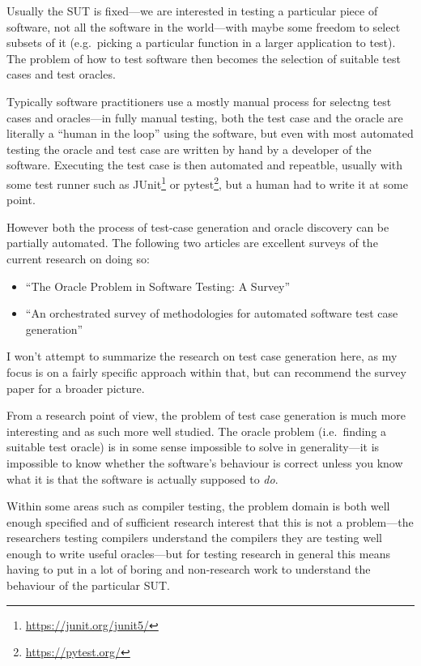 Usually the SUT is fixed---we are interested in testing a particular piece of software,
not all the software in the world---with
maybe some freedom to select subsets of it (e.g.\ picking a particular function in a larger application to test).
The problem of how to test software then becomes the selection of suitable test cases and test oracles.

Typically software practitioners use a mostly manual process for selectng test cases and oracles---in
fully manual testing,
both the test case and the oracle are literally a ``human in the loop'' using the software,
but even with most automated testing the oracle and test case are written by hand by a developer of the software.
Executing the test case is then automated and repeatble, usually with some test runner such as JUnit\footnote{\url{https://junit.org/junit5/}} or pytest\footnote{\url{https://pytest.org/}},
but a human had to write it at some point.

However both the process of test-case generation and oracle discovery can be partially automated.
The following two articles are excellent surveys of the current research on doing so:

\begin{itemize}
\item ``The Oracle Problem in Software Testing: {A} Survey''\cite{DBLP:journals/tse/BarrHMSY15}
\item ``An orchestrated survey of methodologies for automated software test case generation''\cite{DBLP:journals/jss/AnandBCCCGHHMOE13}
\end{itemize}

I won't attempt to summarize the research on test case generation here,
as my focus is on a fairly specific approach within that,
but can recommend the survey paper for a broader picture.

From a research point of view,
the problem of test case generation is much more interesting and as such more well studied.
The oracle problem (i.e.\ finding a suitable test oracle) is in some sense impossible to solve in generality---it
is impossible to know whether the software's behaviour is correct unless you know what it is that the software is actually supposed to \emph{do}.

Within some areas such as compiler testing\cite{DBLP:conf/pldi/YangCER11, DBLP:conf/icse/DonaldsonL16},
the problem domain is both well enough specified and of sufficient research interest that this is not a problem---the
researchers testing compilers understand the compilers they are testing well enough to write useful oracles---but
for testing research in general this means having to put in a lot of boring and non-research work to understand the behaviour of the particular SUT.\ 

